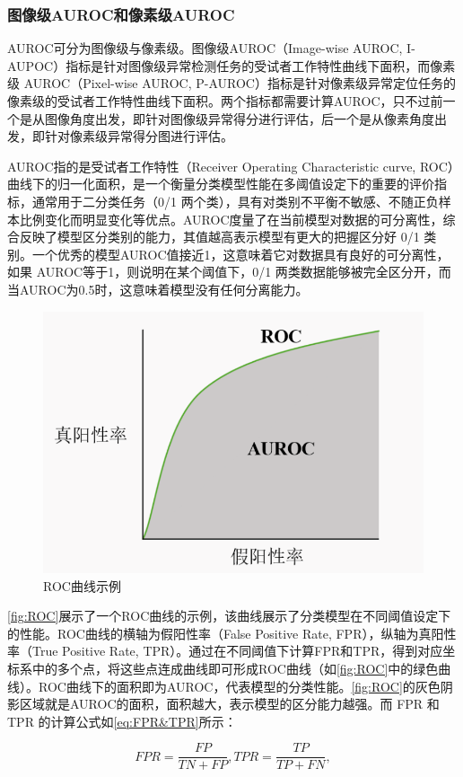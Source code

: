\documentclass[lang=chs, degree=master, blindreview=false, adobe=false]{yanputhesis}
\begin{document}
\subsubsection{图像级AUROC和像素级AUROC}

AUROC可分为图像级与像素级。图像级AUROC（Image-wise AUROC, I-AUPOC）指标是针对图像级异常检测任务的受试者工作特性曲线下面积，而像素级 AUROC（Pixel-wise AUROC, P-AUROC）指标是针对像素级异常定位任务的像素级的受试者工作特性曲线下面积。两个指标都需要计算AUROC，只不过前一个是从图像角度出发，即针对图像级异常得分进行评估，后一个是从像素角度出发，即针对像素级异常得分图进行评估。

AUROC指的是受试者工作特性（Receiver Operating Characteristic curve, ROC）曲线下的归一化面积，是一个衡量分类模型性能在多阈值设定下的重要的评价指标，通常用于二分类任务（0/1 两个类），具有对类别不平衡不敏感、不随正负样本比例变化而明显变化等优点。AUROC度量了在当前模型对数据的可分离性，综合反映了模型区分类别的能力，其值越高表示模型有更大的把握区分好 0/1 类别。一个优秀的模型AUROC值接近1，这意味着它对数据具有良好的可分离性，如果 AUROC等于1，则说明在某个阈值下，0/1 两类数据能够被完全区分开，而当AUROC为0.5时，这意味着模型没有任何分离能力\cite{narkhede2018understanding}。

\begin{figure}[H]
	\centering
	\includegraphics[width=0.5\linewidth]{figs/ROC.png}
	\caption{ROC曲线示例}
	\label{fig:ROC}
\end{figure}

\autoref{fig:ROC}展示了一个ROC曲线的示例，该曲线展示了分类模型在不同阈值设定下的性能。ROC曲线的横轴为假阳性率（False Positive Rate, FPR），纵轴为真阳性率（True Positive Rate, TPR）。通过在不同阈值下计算FPR和TPR，得到对应坐标系中的多个点，将这些点连成曲线即可形成ROC曲线（如\autoref{fig:ROC}中的绿色曲线）。ROC曲线下的面积即为AUROC，代表模型的分类性能。\autoref{fig:ROC}的灰色阴影区域就是AUROC的面积，面积越大，表示模型的区分能力越强。而 FPR 和 TPR 的计算公式如\autoref{eq:FPR&TPR}所示：

\begin{equation}
    \label{eq:FPR&TPR}
    FPR = \frac{FP}{TN + FP}, TPR = \frac{TP}{TP + FN},
\end{equation}
\end{document}
